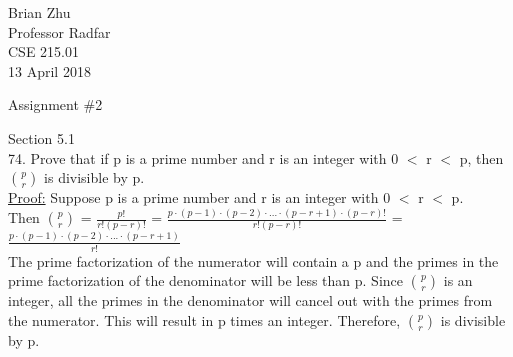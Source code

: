 \documentclass{article}
\begin{document}
\noindent
Brian Zhu \\
Professor Radfar \\
CSE 215.01 \\
13 April 2018 \\
\begin{center}
Assignment \#2
\end{center}

Section 5.1\\
74. Prove that if p is a prime number and r is an integer with 0 $<$ r $<$ p, then {\LARGE $\binom pr$} is divisible by p. \\
\underline{Proof:} Suppose p is a prime number and r is an integer with 0 $<$ r $<$ p. \\
Then {\LARGE $\binom pr$ = $\frac{p!}{r!(p-r)!}$ = $\frac{p \cdot (p - 1) \cdot (p - 2) \cdot ... \cdot (p - r + 1) \cdot (p - r)!}{r!(p-r)!}$ = $\frac{p \cdot (p - 1) \cdot (p - 2) \cdot ... \cdot (p - r + 1)}{r!}$} \\
The prime factorization of the numerator will contain a p and the primes in the prime factorization of the denominator will be less than p. Since {\LARGE $\binom pr$} is an integer, all the primes in the denominator 
will cancel out with the primes from the numerator. This will result in p times an integer. Therefore, {\LARGE $\binom pr$} is divisible by p. \\
\end{document}
